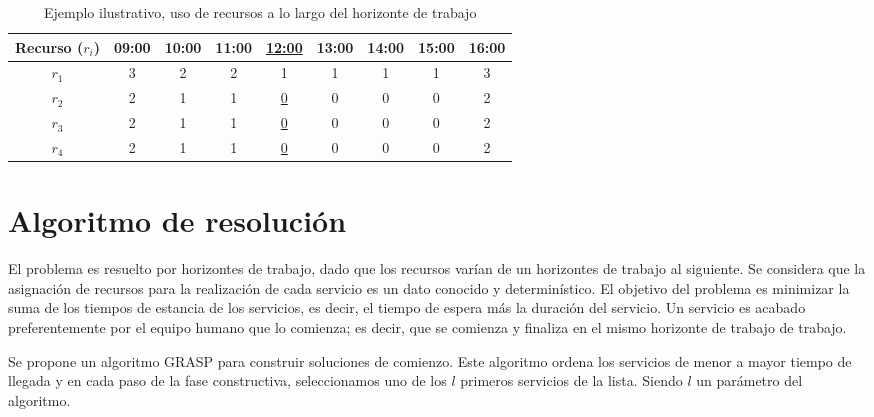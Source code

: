 \begin{table}
\centering
\begin{tabular}{c|c|c|c|c|c|c|c|c}
\toprule
    Recurso ($r_i$) & 09:00 & 10:00 & 11:00 & \underline{12:00} & 13:00 & 14:00 & 15:00 & 16:00 \\
    \hline
    $r_1$ & 3 & 2 & 2 & 1 & 1 & 1 & 1 & 3 \\
    \cline{1-9}
    $r_2$ & 2 & 1 & 1 & \underline{0} & 0 & 0 & 0 & 2 \\
    \cline{1-9}
    $r_3$ & 2 & 1 & 1 & \underline{0} & 0 & 0 & 0 & 2\\
    \cline{1-9}
    $r_4$ & 2 & 1 & 1 & \underline{0} & 0 & 0 & 0 & 2\\
\bottomrule
\end{tabular}
    \caption{Ejemplo ilustrativo, uso de recursos a lo largo del horizonte de trabajo}
\label{ejemploilustrativo-resolucion-uso-de-recursos}
\end{table}

\section{Algoritmo de resolución}

El problema es resuelto por horizontes de trabajo, dado que los recursos varían de un horizontes de trabajo al siguiente. 
Se considera que la asignación de recursos para la realización de cada servicio es un dato conocido y determinístico. %
El objetivo del problema es minimizar la suma de los tiempos de estancia de los servicios, es decir, el tiempo de espera más la duración del servicio. %
Un servicio es acabado preferentemente por el equipo humano que lo comienza; es decir, que se comienza y finaliza en el mismo horizonte de trabajo de trabajo.

Se propone un algoritmo GRASP para construir soluciones de comienzo. Este algoritmo ordena los servicios de menor a mayor tiempo de llegada y en cada paso de la fase constructiva, seleccionamos uno de los $l$ primeros servicios de la lista. Siendo $l$ un parámetro del algoritmo.

